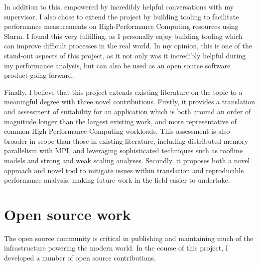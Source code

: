 
In addition to this, empowered by incredibly helpful conversations with my supervisor, I also chose to extend the project by building tooling to facilitate performance measurements on High-Performance Computing resources using Slurm. I found this very fulfilling, as I personally enjoy building tooling which can improve difficult processes in the real world. In my opinion, this is one of the stand-out aspects of this project, as it not only was it incredibly helpful during my performance analysis, but can also be used as an open source software product going forward.

Finally, I believe that this project extends existing literature on the topic to a meaningful degree with three novel contributions. Firstly, it provides a translation and assessment of suitability for an application which is both around an order of magnitude longer than the largest existing work, and more representative of common High-Performance Computing workloads. This assessment is also broader in scope than those in existing literature, including distributed memory parallelism with MPI, and leveraging sophisticated techniques such as roofline models and strong and weak scaling analyses. Secondly, it proposes both a novel approach and novel tool to mitigate issues within translation and reproducible performance analysis, making future work in the field easier to undertake.


\section{Open source work}
\label{sec:open-source-work}

The open source community is critical in publishing and maintaining much of the infrastructure powering the modern world. In the course of this project, I developed a number of open source contributions.

